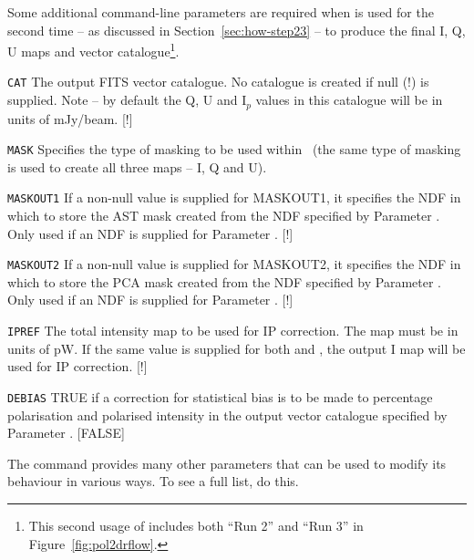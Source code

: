 Some additional command-line parameters are required when  is
used for the second time -- as discussed in Section~\ref{sec:how-step23}
-- to produce the final I, Q, U maps and vector catalogue\footnote{This
second usage of  includes both ``Run 2'' and ``Run 3'' in
Figure~\ref{fig:pol2drflow}.}.

\begin{aligndesc}

\item[\texttt{CAT}] The output FITS vector catalogue. No catalogue is
  created if null (!) is supplied. Note -- by default the Q, U and
  I$_{p}$ values in this catalogue will be in units of mJy/beam. [!]


\item[\texttt{MASK}] Specifies the type of masking to be used within
  \makemap\ (the same type of masking is used to create all three maps --
  I, Q and U).


\item[\texttt{MASKOUT1}] If a non-null value is supplied for MASKOUT1,
  it specifies the NDF in which to store the AST mask created from the
  NDF specified by Parameter . Only used if an NDF is supplied for
  Parameter . [!]


\item[\texttt{MASKOUT2}] If a non-null value is supplied for MASKOUT2,
  it specifies the NDF in which to store the PCA mask created from the
  NDF specified by Parameter . Only used if an NDF is supplied for
  Parameter . [!]


\item[\texttt{IPREF}] The total intensity map to be used for IP
  correction. The map must be in units of pW. If the same value is
  supplied for both  and , the output I map will be used for
  IP correction. [!]

\item[\texttt{DEBIAS}] TRUE if a correction for statistical bias is to
  be made to percentage polarisation and polarised intensity in the
  output vector catalogue specified by Parameter . [FALSE]
\end{aligndesc}

The  command provides many other parameters that can be used to
modify its behaviour in various ways. To see a full list, do this.

\begin{terminalv}
\end{terminalv}


